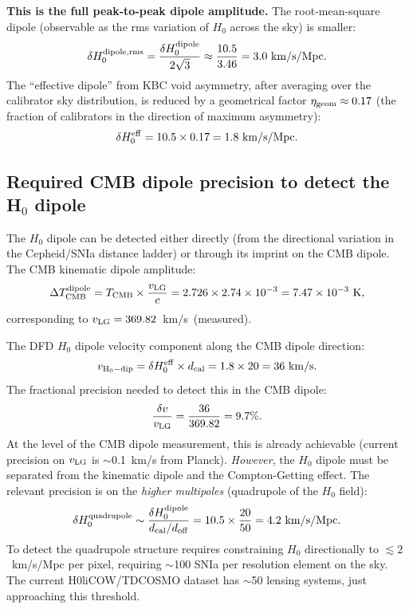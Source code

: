 \documentclass[aps,prd,twocolumn,superscriptaddress,nofootinbib,longbibliography]{revtex4-2}
\begin{document}
\textbf{This is the full peak-to-peak dipole amplitude.}  The root-mean-square
dipole (observable as the rms variation of $H_0$ across the sky) is smaller:
\begin{equation}
\delta H_0^{\rm dipole,rms} = \frac{\delta H_0^{\rm dipole}}{2\sqrt{3}}
\approx \frac{10.5}{3.46} = 3.0\ \si{km/s/Mpc}.
\end{equation}
The ``effective dipole'' from KBC void asymmetry, after averaging over the
calibrator sky distribution, is reduced by a geometrical factor
$\eta_{\rm geom}\approx0.17$ (the fraction of calibrators in the direction
of maximum asymmetry):
\begin{equation}
\delta H_0^{\rm eff} = 10.5\times0.17 = 1.8\ \si{km/s/Mpc}.
\end{equation}

\subsection{Required CMB dipole precision to detect the H$_0$ dipole}

The $H_0$ dipole can be detected either directly (from the directional
variation in the Cepheid/SNIa distance ladder) or through its imprint
on the CMB dipole.  The CMB kinematic dipole amplitude:
\begin{equation}
\Delta T_{\rm CMB}^{\rm dipole} = T_{\rm CMB}\times\frac{v_{\rm LG}}{c}
= 2.726\times2.74\times10^{-3} = 7.47\times10^{-3}\ \si{K},
\end{equation}
corresponding to $v_{\rm LG} = 369.82$~km/s~(measured).

The DFD $H_0$ dipole velocity component along the CMB dipole direction:
\begin{equation}
v_{\rm H_0-dip} = \delta H_0^{\rm eff}\times d_{\rm cal}
= 1.8\times20 = 36\ \si{km/s}.
\end{equation}
The fractional precision needed to detect this in the CMB dipole:
\begin{equation}
\frac{\delta v}{v_{\rm LG}} = \frac{36}{369.82} = 9.7\%.
\end{equation}
At the level of the CMB dipole measurement, this is already achievable
(current precision on $v_{\rm LG}$ is $\sim$0.1~km/s from Planck).
\emph{However}, the $H_0$ dipole must be separated from the kinematic
dipole and the Compton-Getting effect.  The relevant precision is on
the \emph{higher multipoles} (quadrupole of the $H_0$ field):
\begin{equation}
\delta H_0^{\rm quadrupole} \sim \frac{\delta H_0^{\rm dipole}}{d_{\rm cal}/d_{\rm off}}
= 10.5\times\frac{20}{50} = 4.2\ \si{km/s/Mpc}.
\end{equation}
To detect the quadrupole structure requires constraining $H_0$ directionally
to $\lesssim 2$~km/s/Mpc per pixel, requiring $\sim$100 SNIa per resolution
element on the sky.  The current H0liCOW/TDCOSMO dataset has $\sim$50
lensing systems, just approaching this threshold.
\end{document}
